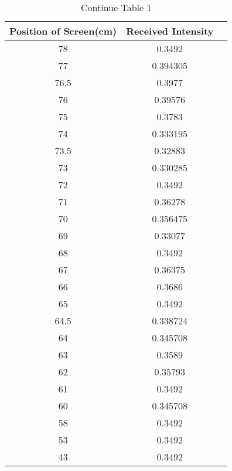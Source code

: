 \documentclass[12pt]{article}
\begin{document}
            \begin{table}[H]
                \centering
                \caption{Continue Table 1}
                \begin{tabular}{c c c}
                \hline
                Position of Screen(cm) & Received Intensity \\
                \hline
                78   & 0.3492    \\
                77   & 0.394305  \\
                76.5 & 0.3977    \\
                76   & 0.39576   \\
                75   & 0.3783    \\
                74   & 0.333195  \\
                73.5 & 0.32883   \\
                73   & 0.330285  \\
                72   & 0.3492    \\
                71   & 0.36278   \\
                70   & 0.356475  \\
                69   & 0.33077   \\
                68   & 0.3492    \\
                67   & 0.36375   \\
                66   & 0.3686    \\
                65   & 0.3492    \\
                64.5 & 0.338724  \\
                64   & 0.345708  \\
                63   & 0.3589    \\
                62   & 0.35793   \\
                61   & 0.3492    \\
                60   & 0.345708  \\
                58   & 0.3492    \\
                53   & 0.3492    \\
                43   & 0.3492\\
                \hline
                \end{tabular}
            \end{table}
            
\end{document}
